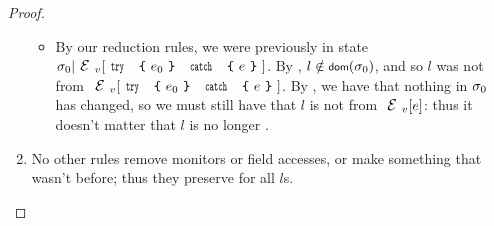 \begin{proof}
\begin{ienumerate}
\begin{enumerate}
	\begin{itemize}
	\item[] By our reduction rules, we were previously in state $\s_0|\EV[\Kw{try}\ \oC e_0\cC\ \Kw{catch}\ \oC e \cC]$. By , $l \notin \dom(\s_0)$, and so $l$ was not \reach from $\EV[\Kw{try}\ \oC e_0\cC\ \Kw{catch}\ \oC e \cC]$. By , we have that nothing in $\sigma_0$  has changed, so we must still have that $l$ is not \reach from $\EV[e]$: thus it doesn't matter that $l$ is no longer \HNO.
	\end{itemize}
	\item No other rules remove monitors or field accesses, or make something \reach that wasn't before; thus they preserve \HNO for all $l$s.
\end{enumerate}


\end{ienumerate}
\end{proof}
